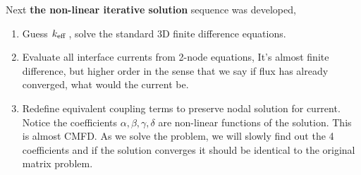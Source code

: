 \documentclass{school-22.211-notes}
\begin{document}
Next \textbf{the non-linear iterative solution} sequence was developed,
\begin{enumerate}
\item  Guess $\left. k_{\mathrm{eff}} \right.$, solve the standard 3D finite difference equations. 

\item Evaluate all interface currents from 2-node equations,
It's almost finite difference, but higher order in the sense that we say if flux has already converged, what would the current be. 

\item Redefine equivalent coupling terms to preserve nodal solution for current. Notice the coefficients $\alpha, \beta, \gamma, \delta$ are non-linear functions of the solution. 
This is almost CMFD. As we solve the problem, we will slowly find out the 4 coefficients and if the solution converges it should be identical to the original matrix problem. 



\end{enumerate}
\end{document}

